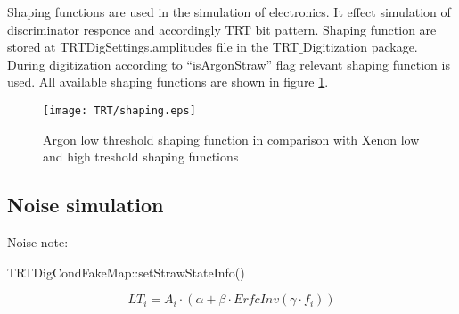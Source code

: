 Shaping functions are used in the simulation of electronics. It effect simulation of discriminator responce and accordingly TRT bit pattern.
Shaping function are stored at \mbox{TRTDigSettings.amplitudes} file in the \mbox{TRT$\_$Digitization} package. During digitization according to ``isArgonStraw'' flag relevant shaping function is used. 
All available shaping functions are shown in figure \ref{fig:shaping}.

\begin{figure}[h]
\begin{center}
 \texttt{[image: TRT/shaping.eps]}
\caption{\label{fig:shaping} Argon low threshold shaping function in comparison with Xenon low and high treshold shaping functions}
\end{center}
\end{figure}





\subsection{Noise simulation}

Noise note:~\cite{noise_note}

TRTDigCondFakeMap::setStrawStateInfo()


\begin{equation}
 LT_i = A_i \cdot (\alpha + \beta \cdot ErfcInv(\gamma \cdot f_i)) %
\end{equation}






